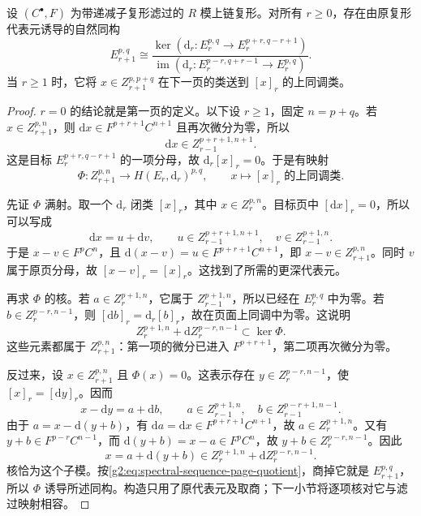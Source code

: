 \begin{theorem}\label{g2:thm:spectral-sequence-page-transition}
	设 \((C^\bullet,F)\) 为带递减子复形滤过的 \(R\) 模上链复形。对所有 \(r\ge0\)，存在由原复形代表元诱导的自然同构
	\[
		E_{r+1}^{p,q}\cong
		\frac{\ker(\mathrm d_r:E_r^{p,q}\to E_r^{p+r,q-r+1})}
		{\operatorname{im}(\mathrm d_r:E_r^{p-r,q+r-1}\to E_r^{p,q})}.
	\]
	当 \(r\ge1\) 时，它将 \(x\in Z_{r+1}^{p,p+q}\) 在下一页的类送到 \([x]_r\) 的上同调类。
\end{theorem}
\begin{proof}
	\(r=0\) 的结论就是第一页的定义。以下设 \(r\ge1\)，固定 \(n=p+q\)。若 \(x\in Z_{r+1}^{p,n}\)，则 \(\mathrm dx\in F^{p+r+1}C^{n+1}\) 且再次微分为零，所以
	\[
		\mathrm dx\in Z_{r-1}^{p+r+1,n+1}.
	\]
	这是目标 \(E_r^{p+r,q-r+1}\) 的一项分母，故 \(\mathrm d_r[x]_r=0\)。于是有映射
	\[
		\Phi:Z_{r+1}^{p,n}\longrightarrow H(E_r,\mathrm d_r)^{p,q},\qquad
		x\longmapsto\text{\([x]_r\) 的上同调类}.
	\]

	先证 \(\Phi\) 满射。取一个 \(\mathrm d_r\) 闭类 \([x]_r\)，其中 \(x\in Z_r^{p,n}\)。目标页中 \([\mathrm dx]_r=0\)，所以可以写成
	\[
		\mathrm dx=u+\mathrm dv,\qquad
		u\in Z_{r-1}^{p+r+1,n+1},\quad v\in Z_{r-1}^{p+1,n}.
	\]
	于是 \(x-v\in F^pC^n\)，且 \(\mathrm d(x-v)=u\in F^{p+r+1}C^{n+1}\)，即 \(x-v\in Z_{r+1}^{p,n}\)。同时 \(v\) 属于原页分母，故 \([x-v]_r=[x]_r\)。这找到了所需的更深代表元。

	再求 \(\Phi\) 的核。若 \(a\in Z_r^{p+1,n}\)，它属于 \(Z_{r-1}^{p+1,n}\)，所以已经在 \(E_r^{p,q}\) 中为零。若 \(b\in Z_r^{p-r,n-1}\)，则 \([\mathrm db]_r=\mathrm d_r[b]_r\)，故在页面上同调中为零。这说明
	\[
		Z_r^{p+1,n}+\mathrm d Z_r^{p-r,n-1}\subset\ker\Phi.
	\]
	这些元素都属于 \(Z_{r+1}^{p,n}\)：第一项的微分已进入 \(F^{p+r+1}\)，第二项再次微分为零。

	反过来，设 \(x\in Z_{r+1}^{p,n}\) 且 \(\Phi(x)=0\)。这表示存在 \(y\in Z_r^{p-r,n-1}\)，使 \([x]_r=[\mathrm dy]_r\)。因而
	\[
		x-\mathrm dy=a+\mathrm db,\qquad
		a\in Z_{r-1}^{p+1,n},\quad b\in Z_{r-1}^{p-r+1,n-1}.
	\]
	由于 \(a=x-\mathrm d(y+b)\)，有 \(\mathrm da=\mathrm dx\in F^{p+r+1}C^{n+1}\)，故 \(a\in Z_r^{p+1,n}\)。又有 \(y+b\in F^{p-r}C^{n-1}\)，而 \(\mathrm d(y+b)=x-a\in F^pC^n\)，故 \(y+b\in Z_r^{p-r,n-1}\)。因此
	\[
		x=a+\mathrm d(y+b)\in Z_r^{p+1,n}+\mathrm d Z_r^{p-r,n-1}.
	\]
	核恰为这个子模。按\eqref{g2:eq:spectral-sequence-page-quotient}，商掉它就是 \(E_{r+1}^{p,q}\)，所以 \(\Phi\) 诱导所述同构。构造只用了原代表元及取商；下一小节将逐项核对它与滤过映射相容。
\end{proof}

